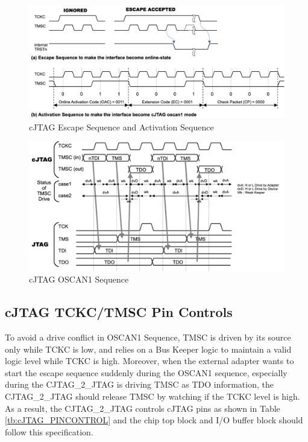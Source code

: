 \begin{figure}[H]
    \includegraphics[width=1.00\columnwidth]{./Figure/cJTAG_ESC_ACT.png}
    \caption{cJTAG Escape Sequence and Activation Sequence}
    \label{fig:cJTAG_ESC_ACT}
\end{figure}

\begin{figure}[H]
    \includegraphics[width=1.00\columnwidth]{./Figure/cJTAG_OSCAN1.png}
    \caption{cJTAG OSCAN1 Sequence}
    \label{fig:cJTAG_OSCAN1}
\end{figure}

\subsection{cJTAG TCKC/TMSC Pin Controls}
\label{sec:cJTAG_PINCTRL}

To avoid a drive conflict in OSCAN1 Sequence, TMSC is driven by its source only while TCKC is low, and relies on a Bus Keeper logic to maintain a valid logic level while TCKC is high. Moreover, when the external adapter wants to start the escape sequence suddenly during the OSCAN1 sequence, especially during the CJTAG\_2\_JTAG is driving TMSC as TDO information, the CJTAG\_2\_JTAG should release TMSC by watching if the TCKC level is high.\\
As a result, the CJTAG\_2\_JTAG controls cJTAG pins as shown in Table \ref{tb:cJTAG_PINCONTROL} and the chip top block and I/O buffer block should follow this specification.\\


